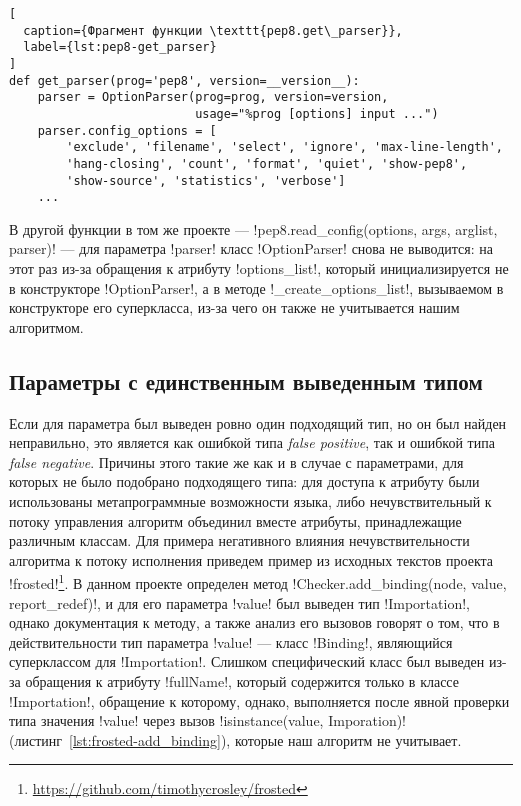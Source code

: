 \newpage
\begin{lstlisting}[
  caption={Фрагмент функции \texttt{pep8.get\_parser}}, 
  label={lst:pep8-get_parser} 
]
def get_parser(prog='pep8', version=__version__):
    parser = OptionParser(prog=prog, version=version,
                          usage="%prog [options] input ...")
    parser.config_options = [
        'exclude', 'filename', 'select', 'ignore', 'max-line-length',
        'hang-closing', 'count', 'format', 'quiet', 'show-pep8',
        'show-source', 'statistics', 'verbose']
    ...
\end{lstlisting}

В другой функции в том же проекте --- 
!pep8.read_config(options, args, arglist, parser)!
--- для параметра !parser!
класс !OptionParser! снова не выводится: на этот раз из-за обращения к атрибуту
!options_list!, который инициализируется не в конструкторе !OptionParser!, а в
методе !_create_options_list!, вызываемом в конструкторе его суперкласса,
из-за чего он также не учитывается нашим алгоритмом.

\subsection{Параметры с единственным выведенным типом}
\label{sub:single-type-parameters}

Если для параметра был выведен ровно один подходящий тип, но он был найден
неправильно, это является как ошибкой типа \emph{false positive}, так и ошибкой типа
\emph{false negative}. Причины этого такие же как и в случае с параметрами, для
которых не было подобрано подходящего типа: для доступа к атрибуту были
использованы метапрограммные возможности языка, либо нечувствительный к потоку
управления алгоритм объединил вместе атрибуты, принадлежащие различным классам.
Для примера негативного влияния нечувствительности алгоритма к потоку исполнения
приведем пример из исходных текстов проекта
!frosted!\footnote{\url{https://github.com/timothycrosley/frosted}}. В данном
проекте определен метод !Checker.add_binding(node, value, report_redef)!, 
и для его параметра !value! был выведен тип !Importation!, однако документация к
методу, а также анализ его вызовов говорят о том, что в действительности тип
параметра !value! --- класс !Binding!, являющийся суперклассом для
!Importation!. Слишком специфический класс был выведен из-за обращения к
атрибуту !fullName!, который содержится только в классе !Importation!, обращение
к которому, однако, выполняется после явной проверки типа значения !value! через
вызов !isinstance(value, Imporation)! (листинг~\ref{lst:frosted-add_binding}),
которые наш алгоритм не учитывает. 

